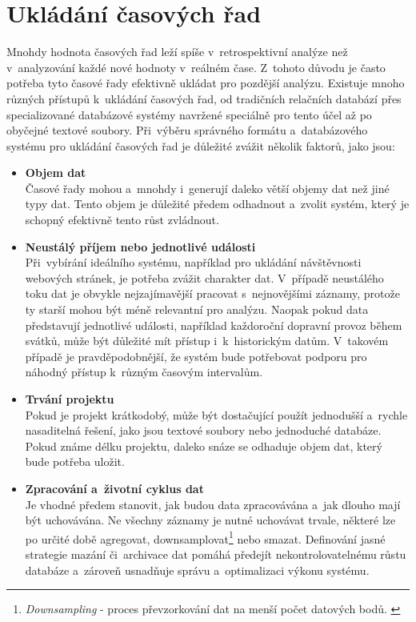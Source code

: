 \section{Ukládání časových řad}
Mnohdy hodnota časových řad leží spíše v~retrospektivní analýze než v~analyzování každé nové hodnoty v~reálném čase.
Z~tohoto důvodu je často potřeba tyto časové řady efektivně ukládat pro pozdější analýzu.
Existuje mnoho různých přístupů k~ukládání časových řad, od tradičních relačních databází přes specializované databázové systémy navržené speciálně pro tento účel až po obyčejné textové soubory.
\cite{nielsen2019practical}
\clearpage
Při~výběru správného formátu a~databázového systému pro ukládání časových řad je důležité zvážit několik faktorů, jako jsou:
\begin{itemize}
    \item \textbf{Objem dat} \\ 
    Časové řady mohou a~mnohdy i~generují daleko větší objemy dat než jiné typy dat. 
    Tento objem je důležité předem odhadnout a~zvolit systém, který je schopný efektivně tento růst zvládnout.
    \cite{kleppmann2017designing}
    
    \item \textbf{Neustálý příjem nebo jednotlivé události} \\
    Při~vybírání ideálního systému, například pro ukládání návštěvnosti webových stránek, je potřeba zvážit charakter dat.  
    V~případě neustálého toku dat je obvykle nejzajímavější pracovat s~nejnovějšími záznamy, protože ty starší mohou být méně relevantní pro analýzu. 
    Naopak pokud data představují jednotlivé události, například každoroční dopravní provoz během svátků, může být důležité mít přístup i~k~historickým datům.
    V~takovém případě je pravděpodobnější, že systém bude potřebovat podporu pro náhodný přístup k~různým časovým intervalům.
    \cite{kleppmann2017designing}
    
    \item \textbf{Trvání projektu} \\
    Pokud je projekt krátkodobý, může být dostačující použít jednodušší a~rychle nasaditelná řešení, jako jsou textové soubory nebo jednoduché databáze.
    Pokud známe délku projektu, daleko snáze se odhaduje objem dat, který bude potřeba uložit.
    \cite{nielsen2019practical}
    
    \item \textbf{Zpracování a~životní cyklus dat} \\ 
    Je vhodné předem stanovit, jak budou data zpracovávána a~jak dlouho mají být uchovávána.  
    Ne všechny záznamy je nutné uchovávat trvale, některé lze po určité době agregovat, downsamplovat\footnote{\textit{Downsampling} - proces převzorkování dat na menší počet datových bodů. \cite{nielsen2019practical}} nebo smazat.  
    Definování jasné strategie mazání či~archivace dat pomáhá předejít nekontrolovatelnému růstu databáze a~zároveň usnadňuje správu a~optimalizaci výkonu systému.  
\end{itemize}    

